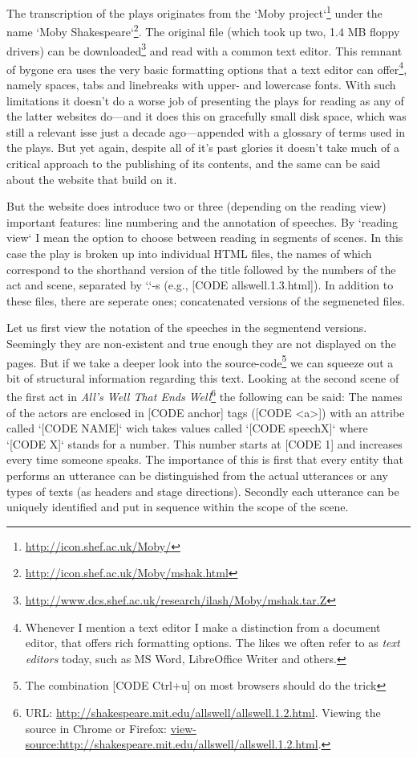 \documentclass{article}
\begin{document}
The transcription of the plays originates from the `Moby project`\footnote{\url{http://icon.shef.ac.uk/Moby/}} under the name `Moby Shakespeare`\footnote{\url{http://icon.shef.ac.uk/Moby/mshak.html}}. The original file (which took up two, 1.4 MB floppy drivers) can be downloaded\footnote{\url{http://www.dcs.shef.ac.uk/research/ilash/Moby/mshak.tar.Z}} and read with a common text editor. This remnant of bygone era uses the very basic formatting options that a text editor can offer\footnote{Whenever I mention a text editor I make a distinction from a document editor, that offers rich formatting options. The likes we often refer to as \textit{text editors} today, such as MS Word, LibreOffice Writer and others.}, namely spaces, tabs and linebreaks with upper- and lowercase fonts. With such limitations it doesn't do a worse job of presenting the plays for reading as any of the latter websites do---and it does this on gracefully small disk space, which was still a relevant isse just a decade ago---appended with a glossary of terms used in the plays. But yet again, despite all of it's past glories it doesn't take much of a critical approach to the publishing of its contents, and the same can be said about the website that build on it.

But the website does introduce two or three (depending on the reading view) important features: line numbering and the annotation of speeches. By `reading view` I mean the option to choose between reading in segments of scenes. In this case the play is broken up into individual HTML files, the names of which correspond to the shorthand version of the title followed by the numbers of the act and scene, separated by `.`-s (e.g., [CODE allswell.1.3.html]). In addition to these files, there are seperate ones; concatenated versions of the segmeneted files. 

Let us first view the notation of the speeches in the segmentend versions. Seemingly they are non-existent and true enough they are not displayed on the pages. But if we take a deeper look into the source-code\footnote{The combination [CODE Ctrl+u] on most browsers should do the trick} we can squeeze out a bit of structural information regarding this text. Looking at the second scene of the first act in \textit{All's Well That Ends Well}\footnote{URL: \url{http://shakespeare.mit.edu/allswell/allswell.1.2.html}. Viewing the source in Chrome or Firefox: \url{view-source:http://shakespeare.mit.edu/allswell/allswell.1.2.html}.} the following can be said: The names of the actors are enclosed in [CODE anchor] tags ([CODE <a>]) with an attribe called `[CODE NAME]` wich takes values called `[CODE speechX]` where `[CODE X]` stands for a number. This number starts at [CODE 1] and increases every time someone speaks. The importance of this is first that every entity that performs an utterance can be distinguished from the actual utterances or any types of texts (as headers and stage directions). Secondly each utterance can be uniquely identified and put in sequence within the scope of the scene.  
\end{document}
